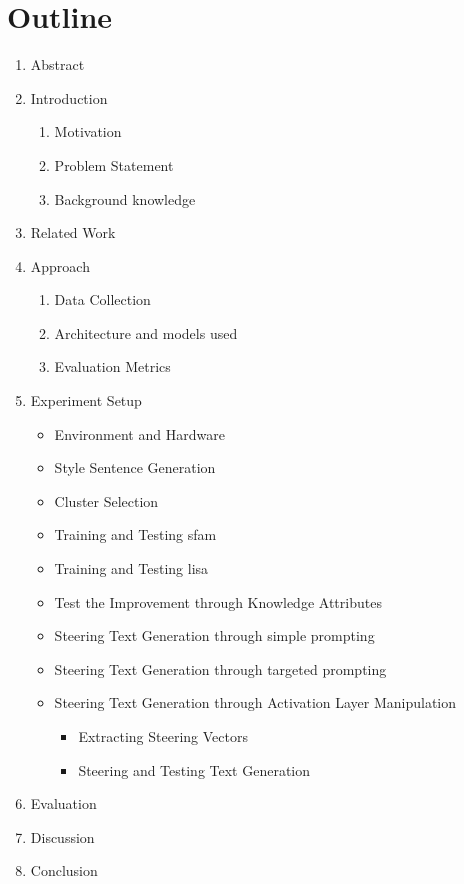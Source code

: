 \clearpage
\section{Outline}

 {

  \begin{enumerate}
	  \item Abstract
	  \item Introduction
	        \begin{enumerate}
		        \item Motivation
		        \item Problem Statement
		        \item Background knowledge
	        \end{enumerate}
	  \item Related Work
	  \item Approach
	        \begin{enumerate}
		        \item Data Collection
		        \item Architecture and models used
		        \item Evaluation Metrics
	        \end{enumerate}
	  \item Experiment Setup
	        \begin{itemize}
		        \item Environment and Hardware
		        \item Style Sentence Generation
		        \item Cluster Selection
		        \item Training and Testing \acs{sfam}
		        \item Training and Testing \acs{lisa}
		        \item Test the Improvement through Knowledge Attributes
		        \item Steering Text Generation through simple prompting
		        \item Steering Text Generation through targeted prompting
		        \item Steering Text Generation through Activation Layer Manipulation
		              \begin{itemize}
			              \item Extracting Steering Vectors
			              \item Steering and Testing Text Generation
		              \end{itemize}
	        \end{itemize}
	  \item Evaluation
	  \item Discussion
	  \item Conclusion
  \end{enumerate}
 }

\clearpage
